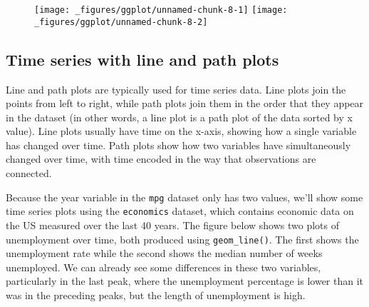 \begin{Shaded}
\begin{Highlighting}[]
\OperatorTok{+}\StringTok{ }\NormalTok{(} \NormalTok{)}
\OperatorTok{+}\StringTok{ }\NormalTok{()}
\end{Highlighting}
\end{Shaded}

\begin{figure}[H]
  \texttt{[image: \_figures/ggplot/unnamed-chunk-8-1]}%
  \texttt{[image: \_figures/ggplot/unnamed-chunk-8-2]}
\end{figure}

\hypertarget{sub:line}{%
\subsection{Time series with line and path plots}\label{sub:line}}

Line and path plots are typically used for time series data. Line plots
join the points from left to right, while path plots join them in the
order that they appear in the dataset (in other words, a line plot is a
path plot of the data sorted by x value). Line plots usually have time
on the x-axis, showing how a single variable has changed over time. Path
plots show how two variables have simultaneously changed over time, with
time encoded in the way that observations are connected.

Because the year variable in the \texttt{mpg} dataset only has two
values, we'll show some time series plots using the \texttt{economics}
dataset, which contains economic data on the US measured over the last
40 years. The figure below shows two plots of unemployment over time,
both produced using \texttt{geom\_line()}. The first shows the
unemployment rate while the second shows the median number of weeks
unemployed. We can already see some differences in these two variables,
particularly in the last peak, where the unemployment percentage is
lower than it was in the preceding peaks, but the length of unemployment
is high.  

\begin{Shaded}
\begin{Highlighting}[]
\OperatorTok{/}\StringTok{ }\OperatorTok{+}
\StringTok{  }\NormalTok{()}
\OperatorTok{+}
\StringTok{  }\NormalTok{()}
\end{Highlighting}
\end{Shaded}

